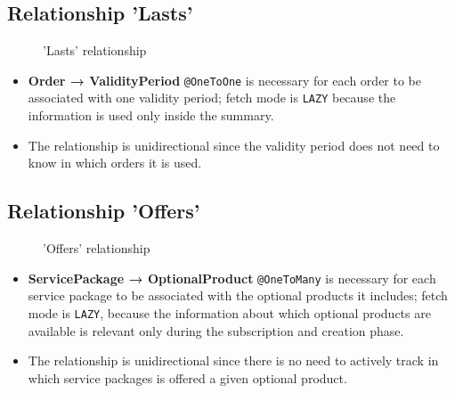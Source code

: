 \subsection*{Relationship 'Lasts'}

\begin{minipage}[h]{0.5\textwidth}
    \begin{figure}[H]
        
        \caption{'Lasts' relationship}
        \label{fig:orm_o_vp}
    \end{figure}
\end{minipage}
\hfill
\begin{minipage}[h]{0.48\textwidth}
    \begin{itemize}
        \item \textbf{Order → ValidityPeriod} \texttt{@OneToOne} is necessary for each order to be associated with one validity period; fetch mode is \texttt{LAZY} because the information is used only inside the summary.
        \item The relationship is unidirectional since the validity period does not need to know in which orders it is used.
    \end{itemize}
\end{minipage}

\subsection*{Relationship 'Offers'}

\begin{minipage}[h]{0.5\textwidth}
    \begin{figure}[H]
        
        \caption{'Offers' relationship}
        \label{fig:orm_sp_op}
    \end{figure}
\end{minipage}
\hfill
\begin{minipage}[h]{0.48\textwidth}
    \begin{itemize}
        \item \textbf{ServicePackage → OptionalProduct} \texttt{@OneToMany} is necessary for each service package to be associated with the optional products it includes; fetch mode is \texttt{LAZY}, because the information about which optional products are available is relevant only during the subscription and creation phase.
        \item The relationship is unidirectional since there is no need to actively track in which service packages is offered a given optional product.
    \end{itemize}
\end{minipage}


